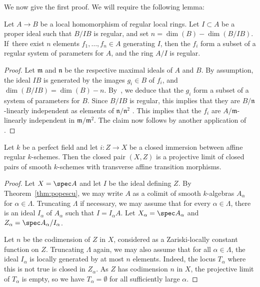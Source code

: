 \begin{num}
We now give the first proof.
We will require the following lemma:

\begin{lm}
\label{lm:local_gen}
Let $A \to B$ be a local homomorphism of regular local rings.
Let $I\subset A$ be a proper ideal such that $B/IB$ is regular, and set $n = \dim(B) - \dim(B/IB)$.
If~there exist $n$ elements $f_1,\ldots,f_n \in A$ generating $I$, then the $f_i$ form a subset of a regular system of parameters for $A$, and the ring $A/I$ is regular.
\end{lm}

\begin{proof}
Let $\mathfrak{m}$ and $\mathfrak{n}$ be the respective maximal ideals of $A$ and $B$.
By assumption, the ideal $IB$ is generated by the images $g_i \in B$ of $f_i$, and \hbox{$\dim(B/IB) = \dim(B) - n$}.
By~\cite[0, Prop.\,16.3.7]{EGA4}, we deduce that the $g_i$ form a subset of a system of parameters for $B$.
Since $B/IB$ is regular, this implies that they are $B/\mathfrak{n}$-linearly independent as elements of $\mathfrak{n}/\mathfrak{n}^2$ \cite[0, Prop.\,17.1.7]{EGA4}.
This implies that the $f_i$ are $A/\mathfrak{m}$-linearly independent in $\mathfrak{m}/\mathfrak{m}^2$.
The claim now follows by another application of \cite[0, Prop.\,17.1.7]{EGA4}.
\end{proof}

\begin{prop}
\label{prop:aff_reg_pur}
Let $k$ be a perfect field and let $i:Z\to X$ be a closed immersion between affine regular $k$-schemes. Then the closed pair $(X,Z)$ is a projective limit of closed pairs of smooth $k$-schemes with transverse affine transition morphisms.
\end{prop}
\begin{proof}
Let $X=\spec A$ and let $I$ be the ideal defining $Z$. By Theorem~\ref{thm:popescu}, we may write $A$ as a colimit of smooth $k$-algebras $A_\alpha$ for $\alpha\in \Lambda$.
Truncating $\Lambda$ if necessary, we may assume that for every $\alpha\in\Lambda$, there is an ideal $I_\alpha$ of $A_\alpha$ such that $I=I_\alpha A$.
Let $X_\alpha=\spec A_\alpha$ and $Z_\alpha=\spec A_\alpha/I_\alpha$.

Let $n$ be the codimension of $Z$ in $X$, considered as a Zariski-locally constant function on $Z$.
Truncating $\Lambda$ again, we may also assume that for all $\alpha\in\Lambda$, the ideal $I_\alpha$ is locally generated by at most $n$ elements. Indeed, the locus $T_\alpha$ where this is not true is closed in $Z_\alpha$. As $Z$ has codimension $n$ in $X$, the projective limit of $T_\alpha$ is empty, so we have $T_\alpha=\emptyset$ for all sufficiently large $\alpha$.


\end{proof}
\end{num}
